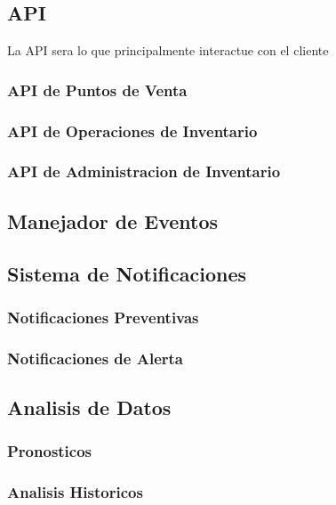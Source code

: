 \subsection{API}

La API sera lo que principalmente interactue con el cliente

\subsubsection{API de Puntos de Venta}

\subsubsection{API de Operaciones de Inventario}

\subsubsection{API de Administracion de Inventario}

\subsection{Manejador de Eventos}

\subsection{Sistema de Notificaciones}

\subsubsection{Notificaciones Preventivas}

\subsubsection{Notificaciones de Alerta}

\subsection{Analisis de Datos}

\subsubsection{Pronosticos}

\subsubsection{Analisis Historicos}